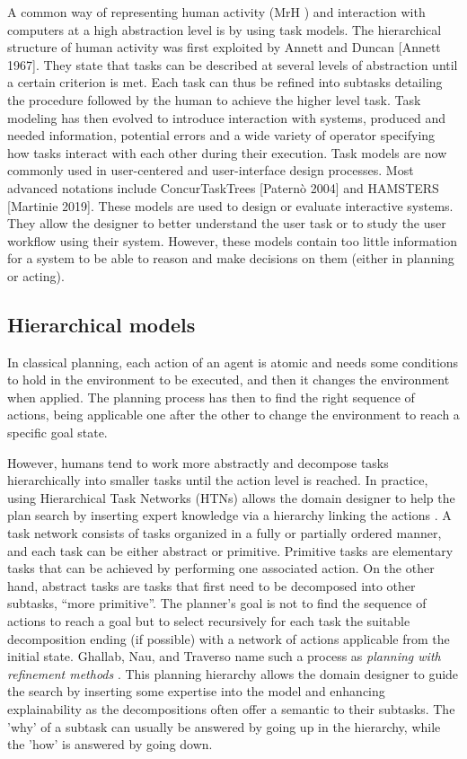 A common way of representing human activity (MrH ) and interaction with computers at a high abstraction level is by using task models. The hierarchical structure of human activity was first exploited by Annett and Duncan [Annett 1967]. They state that tasks can be described at several levels of abstraction until a certain criterion is met. Each task can thus be refined into subtasks detailing the procedure followed by the human to achieve the higher level task. Task modeling has then evolved to introduce interaction with systems, produced and needed information, potential errors and a wide variety of operator specifying how tasks interact with each other during their execution. Task models are now commonly used in user-centered and user-interface design processes. Most advanced notations include ConcurTaskTrees [Paternò 2004] and HAMSTERS [Martinie 2019]. These models are used to design or evaluate interactive systems. They allow the designer to better understand the user task or to study the user workflow using their system. However, these models contain too little information for a system to be able to reason and make decisions on them (either in planning or acting).


\subsection{Hierarchical models}

In classical planning, each action of an agent is atomic and needs some conditions to hold in the environment to be executed, and then it changes the environment when applied. The planning process has then to find the right sequence of actions, being applicable one after the other to change the environment to reach a specific goal state. 

However, humans tend to work more abstractly and decompose tasks hierarchically into smaller tasks until the action level is reached. In practice, using Hierarchical Task Networks (HTNs) allows the domain designer to help the plan search by inserting expert knowledge via a hierarchy linking the actions \cite{erol_complexity_1996}. A task network consists of tasks organized in a fully or partially ordered manner, and each task can be either abstract or primitive. Primitive tasks are elementary tasks that can be achieved by performing one associated action.
On the other hand, abstract tasks are tasks that first need to be decomposed into other subtasks, ``more primitive''. The planner's goal is not to find the sequence of actions to reach a goal but to select recursively for each task the suitable decomposition ending (if possible) with a network of actions applicable from the initial state. Ghallab, Nau, and Traverso name such a process as \textit{planning with refinement methods} \cite{ghallab2016automated}. This planning hierarchy allows the domain designer to guide the search by inserting some expertise into the model and enhancing explainability as the decompositions often offer a semantic to their subtasks. The 'why' of a subtask can usually be answered by going up in the hierarchy, while the 'how' is answered by going down. 

